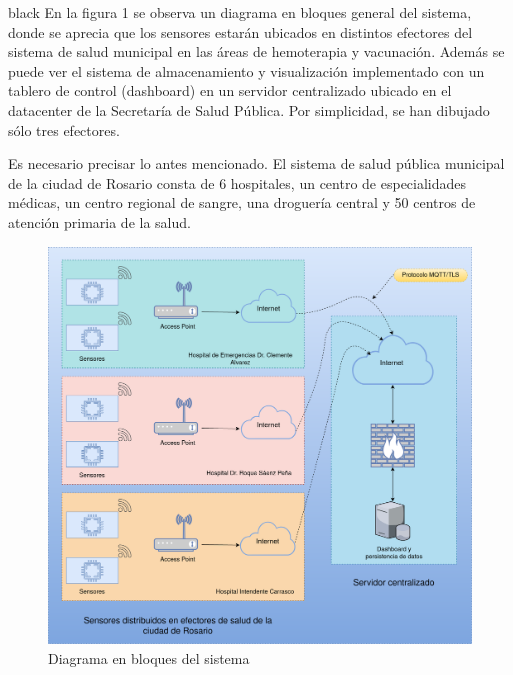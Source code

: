 \documentclass[11pt]{charter}
\begin{document}
\begin{consigna}{black}
En la figura 1 se observa un diagrama en bloques general del sistema, donde se aprecia que los sensores estarán ubicados en distintos efectores del sistema de salud municipal en las áreas de hemoterapia y vacunación. Además se puede ver el sistema de almacenamiento y visualización implementado con un tablero de control  (dashboard) en un servidor centralizado ubicado en el datacenter de la Secretaría de Salud Pública. Por simplicidad, se han dibujado sólo tres efectores. 

Es necesario precisar lo antes mencionado. El sistema de salud pública municipal de la ciudad de Rosario consta de 6 hospitales, un centro de especialidades médicas, un centro regional de sangre, una droguería central y 50 centros de atención primaria de la salud.
\vspace{25px}

\begin{figure}[htpb]
\centering 
\includegraphics[width=.9\textwidth]{./Figuras/bloquesgral.png}
\caption{Diagrama en bloques del sistema}
\label{fig:diagBloques}
\end{figure}

\vspace{25px}

\end{consigna}
\end{document}
